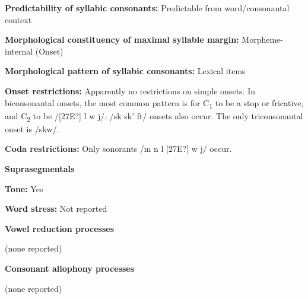 \begin{styleBody}
\textbf{Predictability of syllabic consonants:} Predictable from word/consonantal context
\end{styleBody}

\begin{styleBody}
\textbf{Morphological constituency of maximal syllable margin:} Morpheme-internal (Onset)
\end{styleBody}

\begin{styleBody}
\textbf{Morphological pattern of syllabic consonants:} Lexical items
\end{styleBody}

\begin{styleBody}
\textbf{Onset restrictions: }Apparently no restrictions on simple onsets. In biconsonantal onsets, the most common pattern is for C\textsubscript{1} to be a stop or fricative, and C\textsubscript{2} to be /[27E?] l w j/. /sk sk’ ft/ onsets also occur. The only triconsonantal onset is /skw/.
\end{styleBody}

\begin{styleBody}
\textbf{Coda restrictions: }Only sonorants /m n l [27E?] w j/ occur.
\end{styleBody}

\begin{styleBody}
\textbf{Suprasegmentals}
\end{styleBody}

\begin{styleBody}
\textbf{Tone:} Yes
\end{styleBody}

\begin{styleBody}
\textbf{Word stress:} Not reported
\end{styleBody}

\begin{styleBody}
\textbf{Vowel reduction processes}
\end{styleBody}

\begin{styleBody}
(none reported)
\end{styleBody}

\begin{styleBody}
\textbf{Consonant allophony processes}
\end{styleBody}

\begin{styleBody}
(none reported)
\end{styleBody}

